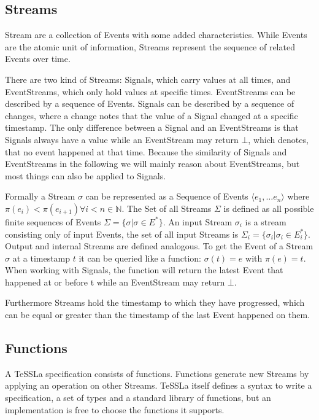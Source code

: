 \subsection{Streams}
\label{sec:concepts:defs:streams}

Stream are a collection of Events with some added characteristics.
While Events are the atomic unit of information, Streams represent the sequence of related Events over time.

There are two kind of Streams: Signals, which carry values at all times, and EventStreams, which only hold values at specific times.
EventStreams can be described by a sequence of Events.
Signals can be described by a sequence of changes, where a change notes that the value of a Signal changed at a specific timestamp.
The only difference between a Signal and an EventStreams is that Signals always have a value while an EventStream may return \(\bot\), which denotes, that no event happened at that time.
Because the similarity of Signals and EventStreams in the following we will mainly reason about EventStreams, but most things can also be applied to Signals.

Formally a Stream \(\sigma\) can be represented as a Sequence of Events \(\langle e_1, \dots e_n\rangle\) where \(\pi(e_i) < \pi(e_{i+1}) \forall i < n \in \mathbb{N}\).
The Set of all Streams \(\Sigma\) is defined as all possible finite sequences of Events \(\Sigma = \{\sigma | \sigma \in E^* \}\).
An input Stream \(\sigma_i\) is a stream consisting only of input Events, the set of all input Streams is \(\Sigma_i = \{\sigma_i | \sigma_i \in E_i^*\}\).
Output and internal Streams are defined analogous.
To get the Event of a Stream \(\sigma\) at a timestamp \(t\) it can be queried like a function: \(\sigma(t) = e\) with \(\pi(e) = t \).
When working with Signals, the function will return the latest Event that happened at or before t while an EventStream may return \(\bot\).

Furthermore Streams hold the timestamp to which they have progressed, which can be equal or greater than the timestamp of the last Event happened on them.


\subsection{Functions}
\label{sec:concepts:defs:functions}

A TeSSLa specification consists of functions.
Functions generate new Streams by applying an operation on other Streams.
TeSSLa itself defines a syntax to write a specification, a set of types and a standard library of functions, but an implementation is free to choose the functions it supports.

